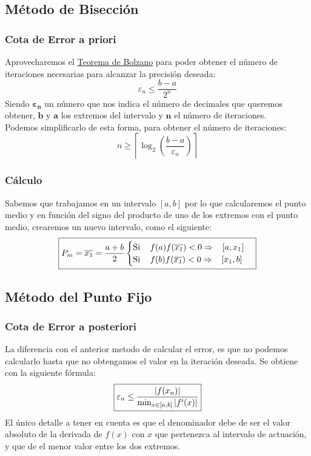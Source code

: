 \subsection{Método de Bisección}
\subsubsection{Cota de Error a priori}
\noindent Aprovecharemos el \underline{Teorema de Bolzano} para poder obtener el número de iteraciones necesarias para alcanzar la precisión deseada:
\[
        \boxed{\varepsilon_n \leq \frac{b-a}{2^n}}
\]
\noindent Siendo \(\mathbf{\varepsilon_n}\) un número que nos indica el número de decimales que queremos obtener, \(\mathbf{b}\) y \(\mathbf{a}\) los extremos del intervalo y \(\mathbf{n}\) el número de iteraciones.\\ Podemos simplificarlo de esta forma, para obtener el número de iteraciones:
\[
        \boxed{n\geq \left \lceil \log_2{\left ( \frac{b-a}{\varepsilon_n} \right )} \right \rceil}
\]
\subsubsection{Cálculo}
\noindent Sabemos que trabajamos en un intervalo \([a,b]\) por lo que calcularemos el punto medio y en función del signo del producto de uno de los extremos con el punto medio, crearemos un nuevo intervalo, como el siguiente:
\[
        \boxed{P_m = \overline{x_1} = \frac{a+b}{2}
                \begin{cases}
                        \text{Si \hspace{3mm}} f(a)f(\overline{x_1}) < 0  \Rightarrow \text{\hspace{3mm}} [a, x_1] \\
                        \text{Si \hspace{3mm}} f(b)f(\overline{x_1}) < 0 \Rightarrow\text{\hspace{3mm}} [x_1, b]
                \end{cases}}
\]
\subsection{Método del Punto Fijo}
\subsubsection{Cota de Error a posteriori}
\noindent La diferencia con el anterior metodo de calcular el error, es que no podemos calcularlo hasta que no obtengamos el valor en la iteración deseada. Se obtiene con la siguiente fórmula:
\[
        \boxed{\varepsilon_n \leq\frac{\left | f(x_n) \right |}{\textnormal{min}_{x \in [a,b]}\left | f'(x) \right |}}
\]
\noindent El único detalle a tener en cuenta es que el denominador debe de ser el valor absoluto de la derivada de \(f(x)\) con \(x\) que pertenezca al intervalo de actuación, y que de el menor valor entre los dos extremos.
